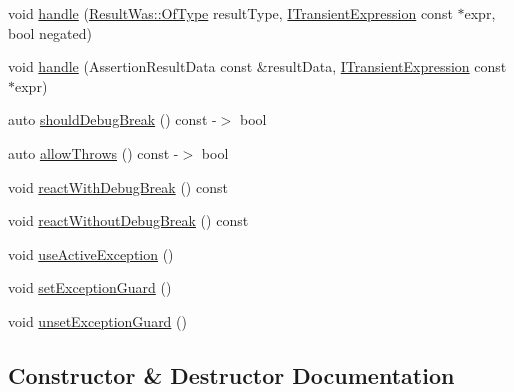 \begin{DoxyCompactItemize}
void \mbox{\hyperlink{classCatch_1_1AssertionHandler_a3878e2f677cfc46bb91511969f81db5a}{handle}} (\mbox{\hyperlink{structCatch_1_1ResultWas_a624e1ee3661fcf6094ceef1f654601ef}{Result\+Was\+::\+Of\+Type}} result\+Type, \mbox{\hyperlink{structCatch_1_1ITransientExpression}{I\+Transient\+Expression}} const $\ast$expr, bool negated)
\item 
void \mbox{\hyperlink{classCatch_1_1AssertionHandler_ac45dca96196b397b3e587650bf6b1a65}{handle}} (Assertion\+Result\+Data const \&result\+Data, \mbox{\hyperlink{structCatch_1_1ITransientExpression}{I\+Transient\+Expression}} const $\ast$expr)
\item 
auto \mbox{\hyperlink{classCatch_1_1AssertionHandler_aecae77fafb26b9525969d8f6132973e5}{should\+Debug\+Break}} () const -\/$>$ bool
\item 
auto \mbox{\hyperlink{classCatch_1_1AssertionHandler_a193bb3999494c46457f3059184c6b251}{allow\+Throws}} () const -\/$>$ bool
\item 
void \mbox{\hyperlink{classCatch_1_1AssertionHandler_ad853c2b10cb31f58de26e91d66d2fd66}{react\+With\+Debug\+Break}} () const
\item 
void \mbox{\hyperlink{classCatch_1_1AssertionHandler_aa3d5009f5f576abdaa0428ec7d4adf63}{react\+Without\+Debug\+Break}} () const
\item 
void \mbox{\hyperlink{classCatch_1_1AssertionHandler_ae5c135c28109bf82efeefeb00c0ddb22}{use\+Active\+Exception}} ()
\item 
void \mbox{\hyperlink{classCatch_1_1AssertionHandler_a5eb26e497cd96b2b2fe3ac1eddce51ce}{set\+Exception\+Guard}} ()
\item 
void \mbox{\hyperlink{classCatch_1_1AssertionHandler_a5638dc6be96257de59b111b6c3dc49f1}{unset\+Exception\+Guard}} ()
\end{DoxyCompactItemize}


\subsection{Constructor \& Destructor Documentation}
\mbox{\label{classCatch_1_1AssertionHandler_a74627e1e399b026e9acbaf95ea673643}} 

